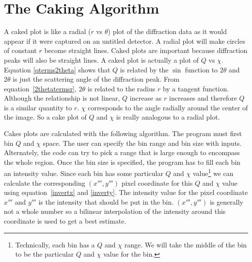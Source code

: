 \section{The Caking Algorithm}

A caked plot is like a radial ($r$ vs $\theta$) plot 
of the diffraction data as it would appear if it were
captured on an untitled detector. A radial plot will make
circles of constant $r$ become straight lines.
Caked plots are important because diffraction peaks will 
also be straight lines. A caked plot is actually a 
plot of $Q$ vs $\chi$. Equation \ref{qterms2theta} shows
that $Q$ is related by the $\sin$ function to 
$2\theta$ and $2\theta$ is just the scattering angle of 
the diffraction peak. From equation~\ref{2thetatermsr},
$2\theta$ is related to the radius $r$ by a tangent function.
Although the relationship is not linear, $Q$ increase as $r$ 
increases and therefore $Q$ is a similar quantity to $r$.
$\chi$ corresponds to the angle radially around the center 
of the image. So a cake plot of $Q$ and $\chi$ is really 
analogous to a radial plot.

Cakes plots are calculated with the following algorithm.
The program must first bin $Q$ and $\chi$ space. The user 
can specify the bin
range and bin size with inputs. Alternately, the code 
can try to pick a range that is large enough to encompass 
the whole region. Once the bin size is specified, the program 
has to fill each bin an intensity value. Since each bin has 
some particular $Q$ and $\chi$ value\footnote{Technically,
each bin has a $Q$ and $\chi$ range. We will
take the middle of the bin to be the
particular $Q$ and $\chi$ value for the bin.} 
we can calculate the corresponding $(x''',y''')$
pixel coordinate for this $Q$ and $\chi$ value using 
equation~\ref{invertx} and \ref{inverty}. The
intensity value for the pixel coordinate $x'''$ and $y'''$
is the intensity that should be put in the bin.
$(x''',y''')$ is generally not a whole number so a
bilinear interpolation of the intensity around
this coordinate is used to get a best estimate.

